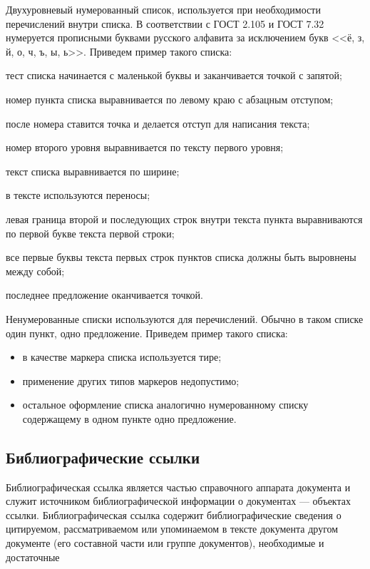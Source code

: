 \documentclass[12pt,a4paper, oneside]{extreport}
\begin{document}
Двухуровневый нумерованный список, используется при необходимости перечислений внутри списка. В соответствии с ГОСТ 2.105 и ГОСТ 7.32 нумеруется прописными буквами русского алфавита за исключением букв <<ё, з, й, о, ч, ъ, ы, ь>>. Приведем пример такого списка:
	\begin{twoenumerate}
		\item тест списка начинается с маленькой буквы и заканчивается точкой с запятой;
		\item номер пункта списка выравнивается по левому краю с абзацным отступом;
		\item после номера ставится точка и делается отступ для написания текста;
		\item номер второго уровня выравнивается по тексту первого уровня;
			\begin{twoenumerate}
				\item текст списка выравнивается по ширине;
				\item в тексте используются переносы;
				\item левая граница второй и последующих строк внутри текста пункта выравниваются по первой букве текста первой строки;
			\end{twoenumerate}
		\item все первые буквы текста первых строк пунктов списка должны быть выровнены между собой;
		\item последнее предложение оканчивается точкой.
	\end{twoenumerate}

Ненумерованные списки используются для перечислений. Обычно в таком списке один пункт, одно предложение. Приведем пример такого списка:
\begin{itemize}
	\item в качестве маркера списка используется тире;
	\item применение других типов маркеров недопустимо;
	\item остальное оформление списка аналогично нумерованному списку содержащему в одном пункте одно предложение.
\end{itemize}


\subsection{Библиографические ссылки}


 Библиографическая ссылка является частью справочного аппарата документа и служит источником библиографической информации о документах --- объектах ссылки. Библиографическая ссылка содержит библиографические сведения о цитируемом, рассматриваемом или упоминаемом в тексте документа другом документе (его составной части или группе документов), необходимые и достаточные
\end{document}
